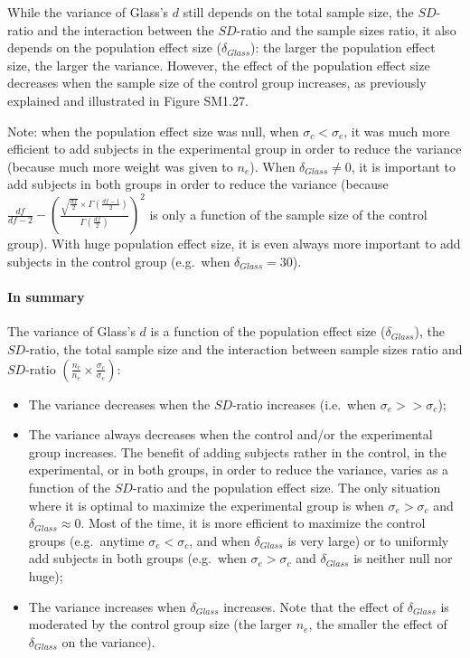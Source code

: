 \documentclass[
  english,
  man,mask,floatsintext]{apa6}
\providecommand{\tightlist}{%
  \setlength{\itemsep}{0pt}\setlength{\parskip}{0pt}}
\let\oldparagraph\paragraph
\renewcommand{\paragraph}[1]{\oldparagraph{#1}\mbox{}}
\begin{document}
While the variance of Glass's \(d\) still depends on the total sample size, the \(SD\)-ratio and the interaction between the \(SD\)-ratio and the sample sizes ratio, it also depends on the population effect size (\(\delta_{Glass}\)): the larger the population effect size, the larger the variance. However, the effect of the population effect size decreases when the sample size of the control group increases, as previously explained and illustrated in Figure SM1.27.

Note: when the population effect size was null, when \(\sigma_c<\sigma_e\), it was much more efficient to add subjects in the experimental group in order to reduce the variance (because much more weight was given to \(n_e\)). When \(\delta_{Glass} \neq 0\), it is important to add subjects in both groups in order to reduce the variance (because \(\frac{df}{df-2} - \left( \frac{\sqrt{\frac{df}{2}} \times \Gamma \left(\frac{df-1}{2} \right)}{\Gamma \left( \frac{df}{2}\right)}\right)^2\) is only a function of the sample size of the control group). With huge population effect size, it is even always more important to add subjects in the control group (e.g.~when \(\delta_{Glass}=30\)).

\hypertarget{in-summary-2}{%
\paragraph{In summary}\label{in-summary-2}}

The variance of Glass's \(d\) is a function of the population effect size (\(\delta_{Glass}\)), the \(SD\)-ratio, the total sample size and the interaction between sample sizes ratio and \(SD\)-ratio \(\left(\frac{n_c}{n_e}\times\frac{\sigma_c}{\sigma_e} \right)\):

\begin{itemize}
\tightlist
\item
  The variance decreases when the \(SD\)-ratio increases (i.e.~when \(\sigma_e >> \sigma_c\));\\
\item
  The variance always decreases when the control and/or the experimental group increases. The benefit of adding subjects rather in the control, in the experimental, or in both groups, in order to reduce the variance, varies as a function of the \(SD\)-ratio and the population effect size. The only situation where it is optimal to maximize the experimental group is when \(\sigma_e > \sigma_c\) and \(\delta_{Glass} \approx 0\). Most of the time, it is more efficient to maximize the control groups (e.g.~anytime \(\sigma_e < \sigma_c\), and when \(\delta_{Glass}\) is very large) or to uniformly add subjects in both groups (e.g.~when \(\sigma_e > \sigma_c\) and \(\delta_{Glass}\) is neither null nor huge);
\item
  The variance increases when \(\delta_{Glass}\) increases. Note that the effect of \(\delta_{Glass}\) is moderated by the control group size (the larger \(n_e\), the smaller the effect of \(\delta_{Glass}\) on the variance).
\end{itemize}
\end{document}
